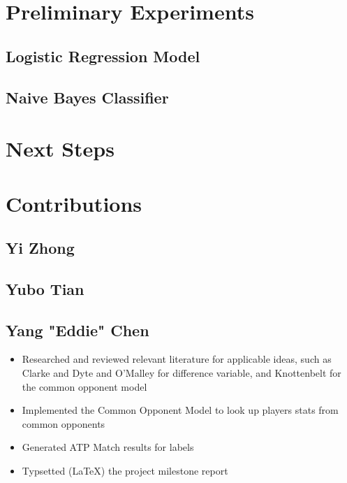 \documentclass[paper=a4, fontsize=11pt]{scrartcl} %
\numberwithin{equation}{section} %
\numberwithin{figure}{section} %
\numberwithin{table}{section} %
\begin{document}
\section{Preliminary Experiments}
\subsection{Logistic Regression Model}
\subsection{Naive Bayes Classifier}


\section{Next Steps}


\section{Contributions}
\subsection{Yi Zhong}
\subsection{Yubo Tian}
\subsection{Yang "Eddie" Chen}
\begin{itemize}
\item Researched and reviewed relevant literature for applicable ideas, such as Clarke and Dyte \cite{Clarke2010} and O'Malley \cite{omalley} for difference variable, and Knottenbelt \cite{KNOTTENBELT20123820} for the common opponent model
\item Implemented the Common Opponent Model to look up players stats from common opponents
\item Generated ATP Match results for labels
\item Typsetted (\LaTeX) the project milestone report
\end{itemize}
\end{document}
